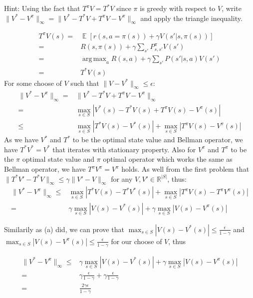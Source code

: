 \documentclass[11pt]{article}
\theoremstyle{case}
\DeclareMathOperator{\E}{\mathbb{E}}
\newcommand{\norm}[2][2]{\| #2\|}
\DeclareMathOperator*{\argmax}{arg\,max}
\begin{document}
\begin{enumerate}[label=(\alph*)]
    Hint: Using the fact that $T^\pi V = T^* V$ since $\pi$ is greedy with respect to $V$, write $\norm{V^* -V^\pi}_\infty = \norm{V^* -T^* V + T^\pi V - V^\pi}_\infty$ and apply the triangle inequality.
    \begin{shaded}
\begin{align*}
 T^\pi V(s) = & \E [ r(s,a = \pi(s)) + \gamma V(s'|s,\pi(s))]\\
							= &  R(s,\pi(s)) + \gamma \sum_{s'}P^{\pi}_{s,s'}V(s')\\
							= & \argmax_a R(s,a) + \gamma \sum_{s'}P(s'|s,a)V(s')\\
						  = &  T^* V(s) 
\end{align*}
For some choose of $V$ such that $\norm{V-V^*}_\infty\leq\epsilon$:
\begin{align*}
\norm{V^* -V^\pi}_\infty = &\norm{V^* -T^* V + T^\pi V - V^\pi}_\infty\\ 	
										  = &\max_{s \in S}|V^*(s) -T^* V(s) + T^\pi V(s) - V^\pi(s)|\\
										  \leq &\max_{s \in S}|T^* V(s)-V^*(s)| + \max_{s \in S}|T^\pi V(s) - V^\pi(s)|
\end{align*}
As we have $V^*$ and $T^*$ to be the optimal state value and Bellman operator, we have $T^*V^*=V^*$ that iterates with stationary property. Also for $V^{\pi}$ and $T^{\pi}$ to be the $\pi$ optimal state value and $\pi$ optimal operator which works the same as Bellman operator, we have $T^{\pi}V^{\pi}=V^{\pi}$ holds. As well from the first problem that $\norm{T^*V'-T^*V}_\infty\leq\gamma\norm{V'-V}_\infty$ for any $V,V'\in\mathbb{R}^{|S|}$, thus:
\begin{align*}
\norm{V^* -V^\pi}_\infty  \leq &\max_{s \in S}|T^* V(s)-T^*V^*(s)| + \max_{s \in S}|T^\pi V(s) - T^\pi V^\pi(s)|\\
																		  =&\gamma \max_{s \in S}|V(s)-V^*(s)| + \gamma \max_{s \in S}|V(s) - V^\pi(s)|
\end{align*}

Similarily as (a) did, we can prove that $\max_{s \in S}|V(s)-V^*(s)| \leq \frac{\epsilon}{1-\gamma}$ and $\max_{s \in S}|V(s)-V^{\pi}(s)| \leq \frac{\epsilon}{1-\gamma}$ for our choose of $V$, thus

\begin{align*}
\norm{V^* -V^\pi}_\infty  \leq &\gamma \max_{s \in S}|V(s)-V^*(s)| + \gamma \max_{s \in S}|V(s) - V^\pi(s)|\\
												= & \gamma \frac{\epsilon}{1-\gamma} + \gamma \frac{\epsilon}{1-\gamma} \\
	= & \frac{2 \gamma \epsilon}{1-\gamma}
\end{align*}

    \end{shaded}
\end{enumerate}
\end{document}
